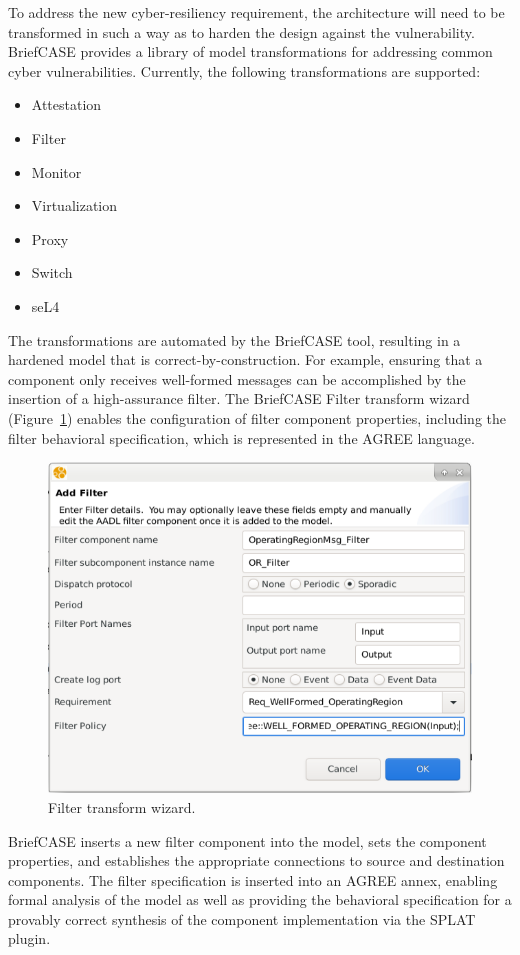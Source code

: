 To address the new cyber-resiliency requirement, the architecture will need to be transformed in such a way as to harden the design against the vulnerability.
BriefCASE provides a library of model transformations for addressing common cyber vulnerabilities.  Currently, the following transformations are supported:

\begin{itemize}
	\item Attestation
	\item Filter
	\item Monitor
	\item Virtualization
	\item Proxy
	\item Switch
	\item seL4
\end{itemize}  

The transformations are automated by the BriefCASE tool, resulting in a hardened model that is correct-by-construction.  
For example, ensuring that a component only receives well-formed messages can be accomplished by the insertion of a high-assurance filter.  The BriefCASE Filter transform wizard (Figure~\ref{fig:filter-wiz}) enables the configuration of filter component properties, including the filter behavioral specification, which is represented in the AGREE language.

\begin{figure}[h]
	\centering
	\includegraphics[width=0.7\columnwidth]{figs/filter-wiz.png}
	\caption{Filter transform wizard.} 
	\label{fig:filter-wiz} 
\end{figure}

BriefCASE inserts a new filter component into the model, sets the component properties, and establishes the appropriate connections to source and destination components. The filter specification is inserted into an AGREE annex, enabling formal analysis of the model as well as providing the behavioral specification for a provably correct synthesis of the component implementation via the SPLAT plugin.

